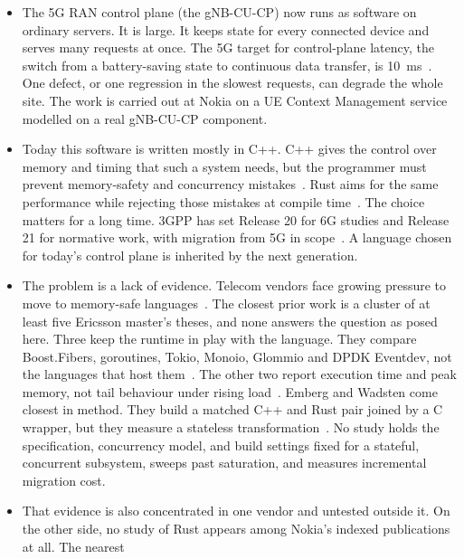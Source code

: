 \documentclass[english,twoside,openright,a4paper,censored,csm,software-track-2020]{HYthesisML}
\begin{document}
\begin{itemize}
  \item The 5G RAN control plane (the gNB-CU-CP) now runs as software on ordinary servers.
        It is large. It keeps state for every connected device and serves many requests at
        once. The 5G target for control-plane latency, the switch from a battery-saving state
        to continuous data transfer, is 10~ms~\cite{3gpp38913}. One defect, or one regression
        in the slowest requests, can degrade the whole site. The work is carried out at Nokia on
        a UE Context Management service modelled on a real gNB-CU-CP component.
  \item Today this software is written mostly in C++. C++ gives the control over memory and
        timing that such a system needs, but the programmer must prevent memory-safety and
        concurrency mistakes~\cite{szekeres2013sok}. Rust aims for the same performance while
        rejecting those mistakes at compile time~\cite{klabnik2023rust}. The choice matters for
        a long time. 3GPP has set Release 20 for 6G studies and Release 21 for normative work,
        with migration from 5G in scope~\cite{3gpp2024road6g}. A language chosen for today's
        control plane is inherited by the next generation.
  \item The problem is a lack of evidence. Telecom vendors face growing pressure to move to
        memory-safe languages~\cite{cisa2023memorysafe}. The closest prior work is a cluster of
        at least five Ericsson master's theses, and none answers the question as posed here.
        Three keep the runtime in play with the language. They compare Boost.Fibers, goroutines,
        Tokio, Monoio, Glommio and DPDK Eventdev, not the languages that host
        them~\cite{karlback2021ran,olsson2023asyncpackets,arvidsson2025async}. The other two
        report execution time and peak memory, not tail behaviour under rising
        load~\cite{olsson2023ranmgmt,emberg2023asn1}. Emberg and Wadsten come closest in method.
        They build a matched C++ and Rust pair joined by a C wrapper, but they measure a
        stateless transformation~\cite{emberg2023asn1}. No study holds the specification,
        concurrency model, and build settings fixed for a stateful, concurrent subsystem, sweeps
        past saturation, and measures incremental migration cost.
  \item That evidence is also concentrated in one vendor and untested outside it. On the other
        side, no study of Rust appears among Nokia's indexed publications at all. The nearest

\end{itemize}
\end{document}
